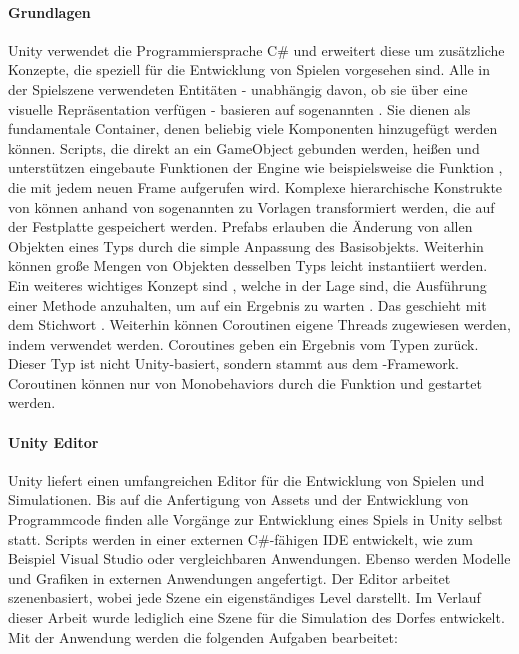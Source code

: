 \paragraph{Grundlagen}\label{scripting_unity_basics}
Unity verwendet die Programmiersprache C\# und erweitert diese um zusätzliche Konzepte, die speziell für die Entwicklung von Spielen vorgesehen sind. Alle in der Spielszene verwendeten Entitäten - unabhängig davon, ob sie über eine visuelle Repräsentation verfügen - basieren auf sogenannten . Sie dienen als fundamentale Container, denen beliebig viele Komponenten hinzugefügt werden können. Scripts, die direkt an ein GameObject gebunden werden, heißen  und unterstützen eingebaute Funktionen der Engine wie beispielsweise die Funktion , die mit jedem neuen Frame aufgerufen wird. Komplexe hierarchische Konstrukte von  können anhand von sogenannten  zu Vorlagen transformiert werden, die auf der Festplatte gespeichert werden. Prefabs erlauben die Änderung von allen Objekten eines Typs durch die simple Anpassung des Basisobjekts. Weiterhin können große Mengen von Objekten desselben Typs leicht instantiiert werden.
Ein weiteres wichtiges Konzept sind , welche in der Lage sind, die Ausführung einer Methode anzuhalten, um auf ein Ergebnis zu warten \cite{unity_coroutines}. Das geschieht mit dem Stichwort . Weiterhin können Coroutinen eigene Threads zugewiesen werden, indem  verwendet werden. Coroutines geben ein Ergebnis vom Typen  zurück. Dieser Typ ist nicht Unity-basiert, sondern stammt aus dem -Framework. Coroutinen können nur von Monobehaviors durch die Funktion  und  gestartet werden.


\paragraph{Unity Editor}
Unity liefert einen umfangreichen Editor für die Entwicklung von Spielen und Simulationen. Bis auf die Anfertigung von Assets und der Entwicklung von Programmcode finden alle Vorgänge zur Entwicklung eines Spiels in Unity selbst statt. Scripts werden in einer externen C\#-fähigen IDE entwickelt, wie zum Beispiel Visual Studio oder vergleichbaren Anwendungen. Ebenso werden Modelle und Grafiken in externen Anwendungen angefertigt.
Der Editor arbeitet szenenbasiert, wobei jede Szene ein eigenständiges Level darstellt. Im Verlauf dieser Arbeit wurde lediglich eine Szene für die Simulation des Dorfes entwickelt. Mit der Anwendung werden die folgenden Aufgaben bearbeitet:

